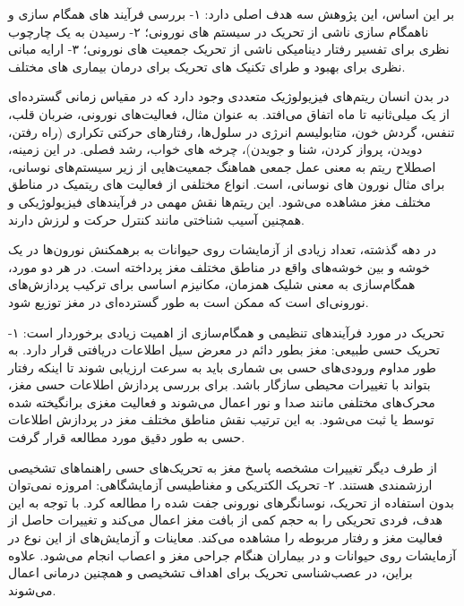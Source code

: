 بر این اساس، این پژوهش سه هدف اصلی دارد: 
۱- بررسی فرآیند های همگام سازی و ناهمگام سازی ناشی از تحریک در سیستم های نورونی؛ ۲- رسیدن به یک چارچوب نظری برای تفسیر رفتار دینامیکی ناشی از تحریک جمعیت های نورونی؛ ۳- ارایه مبانی نظری برای بهبود و طرای تکنیک های تحریک برای درمان بیماری های مختلف.

در بدن انسان ریتم‌های فیزیولوژیک متعددی وجود دارد که در مقیاس زمانی گسترده‌ای از یک میلی‌ثانیه تا ماه اتفاق می‌افتد. به عنوان مثال، فعالیت‌های نورونی، ضربان قلب، تنفس، گردش خون، متابولیسم انرژی در سلول‌ها، رفتارهای حرکتی تکراری (راه رفتن، دویدن، پرواز کردن، شنا و جویدن)، چرخه های خواب، رشد فصلی. در این زمینه، اصطلاح ریتم به معنی عمل جمعی هماهنگ جمعیت‌هایی از زیر سیستم‌های نوسانی، برای مثال نورون های نوسانی، است.
انواع مختلفی از فعالیت های ریتمیک در مناطق مختلف مغز مشاهده می‌شود. این ریتم‌ها نقش مهمی در فرآیندهای فیزیولوژیکی و همچنین آسیب شناختی مانند کنترل حرکت و لرزش دارند. 

در دهه گذشته، تعداد زیادی از آزمایشات روی حیوانات به برهمکنش نورون‌ها در یک خوشه و بین خوشه‌های واقع در مناطق مختلف مغز پرداخته است. در هر دو مورد، همگام‌سازی به معنی شلیک همزمان، مکانیزم اساسی برای ترکیب پردازش‌های نورونی‌ای است که ممکن است به طور گسترده‌ای در مغز توزیع شود.

تحریک در مورد فرآیند‌های تنظیمی و همگام‌سازی از اهمیت زیادی برخوردار است:
۱- تحریک حسی طبیعی: مغز بطور دائم در معرض سیل اطلاعات دریافتی قرار دارد. به طور مداوم ورودی‌های حسی بی شماری باید به سرعت ارزیابی شوند تا اینکه رفتار بتواند با تغییرات محیطی سازگار باشد. برای بررسی پردازش اطلاعات حسی مغز، محرک‌های مختلفی مانند صدا و نور اعمال می‌شوند و فعالیت مغزی برانگیخته شده توسط 
یا 
ثبت می‌شود. به این ترتیب نقش مناطق مختلف مغز در پردازش اطلاعات حسی به طور دقیق مورد مطالعه قرار گرفت. 

از طرف دیگر تغییرات مشخصه پاسخ مغز به تحریک‌های حسی راهنماهای تشخیصی ارزشمندی هستند. 
۲- تحریک الکتریکی و مغناطیسی آزمایشگاهی: امروزه نمی‌توان بدون استفاده از تحریک، نوسانگرهای نورونی جفت شده را مطالعه کرد. با توجه به این هدف، فردی تحریکی را به حجم کمی از بافت مغز اعمال می‌کند و تغییرات حاصل از فعالیت مغز و رفتار مربوطه را مشاهده می‌کند. معاینات و آزمایش‌های از این نوع در آزمایشات روی حیوانات و در بیماران هنگام جراحی مغز و اعصاب انجام می‌شود. علاوه براین، در عصب‌شناسی تحریک برای اهداف تشخیصی و همچنین درمانی اعمال می‌شوند. 


